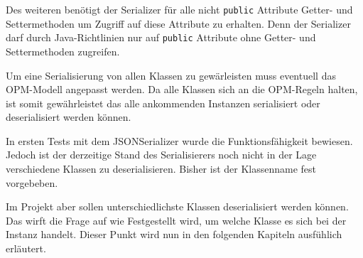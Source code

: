Des weiteren ben\"otigt der Serializer f\"ur alle nicht \texttt{public} Attribute Getter- und Settermethoden um Zugriff auf diese Attribute zu erhalten. Denn der Serializer darf durch Java-Richtlinien nur auf \texttt{public} Attribute ohne Getter- und Settermethoden zugreifen.

Um eine Serialisierung von allen Klassen zu gew\"arleisten muss eventuell das OPM-Modell angepasst werden.
Da alle Klassen sich an die OPM-Regeln halten, ist somit gew\"ahrleistet das alle ankommenden Instanzen serialisiert oder deserialisiert werden k\"onnen.

In ersten Tests mit dem JSONSerializer wurde die Funktionsf\"ahigkeit bewiesen. Jedoch ist der derzeitige Stand des Serialisierers noch nicht in der Lage verschiedene Klassen zu deserialisieren. Bisher ist der Klassenname fest vorgebeben.

Im Projekt aber sollen unterschiedlichste Klassen deserialisiert werden k\"onnen. Das wirft die Frage auf wie Festgestellt wird, um welche Klasse es sich bei der Instanz handelt. Dieser Punkt wird nun in den folgenden Kapiteln ausf\"uhlich erl\"autert.



